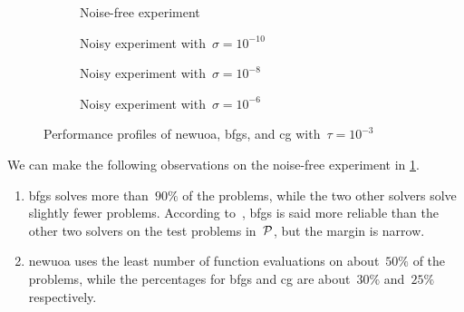\begin{figure}[ht]
    \centering
    \begin{subfigure}[b]{0.49\textwidth}
        \centering
        \caption{Noise-free experiment}
        \label{fig:performance-profile-example-noiseless}
    \end{subfigure}
    \hfill
    \begin{subfigure}[b]{0.49\textwidth}
        \centering
        \caption{Noisy experiment with~$\sigma = 10^{-10}$}
        \label{fig:performance-profile-example-noisy-10}
    \end{subfigure}
    \par\bigskip
    \begin{subfigure}[b]{0.49\textwidth}
        \centering
        \caption{Noisy experiment with~$\sigma = 10^{-8}$}
        \label{fig:performance-profile-example-noisy-8}
    \end{subfigure}
    \hfill
    \begin{subfigure}[b]{0.49\textwidth}
        \centering
        \caption{Noisy experiment with~$\sigma = 10^{-6}$}
        \label{fig:performance-profile-example-noisy-6}
    \end{subfigure}
    \caption{Performance profiles of \gls{newuoa}, \gls{bfgs}, and \gls{cg} with~$\tau = 10^{-3}$}
    \label{fig:performance-profile-example}
\end{figure}

We can make the following observations on the noise-free experiment in \cref{fig:performance-profile-example-noiseless}.
\begin{enumerate}
    \item \Gls{bfgs} solves more than~$90\%$ of the problems, while the two other solvers solve slightly fewer problems.
    According to~\cite[\S~2]{More_Wild_2009}, \gls{bfgs} is said more reliable than the other two solvers on the test problems in~$\mathcal{P}$, but the margin is narrow.
    \item \Gls{newuoa} uses the least number of function evaluations on about~$50\%$ of the problems, while the percentages for \gls{bfgs} and \gls{cg} are about~$30\%$ and~$25\%$ respectively.
\end{enumerate}

